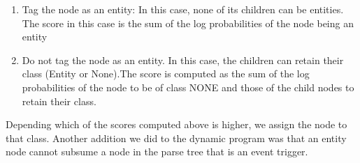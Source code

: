 \begin{enumerate} 
\item Tag the node as an entity: In this case, none of its children can be entities. The score in this case is the sum of the log probabilities of the node being an entity
\item Do not tag the node as an entity. In this case, the children can retain their class (Entity or None).The score is computed as the sum of the log probabilities of the node to be of class NONE and those of the child nodes to retain their class.
\end{enumerate}

Depending which of the scores computed above is higher, we assign the node to that class. Another addition we did to the dynamic program was that an entity node cannot subsume a node in the parse tree that is an event trigger. 